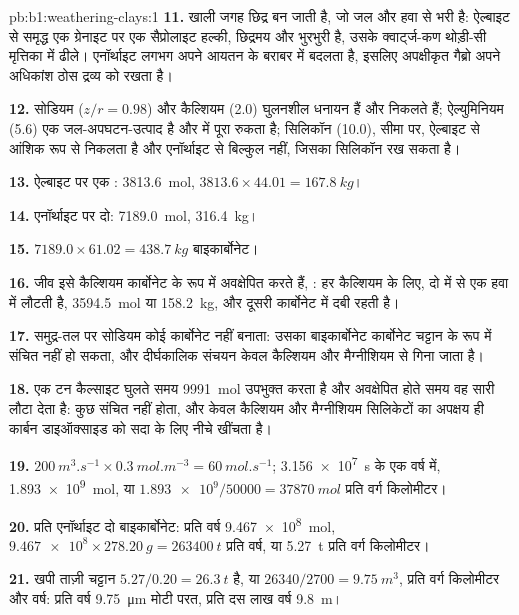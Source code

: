 \begin{solution}{pb:b1:weathering-clays:1}
\textbf{11.} खाली जगह छिद्र बन जाती है, जो जल और हवा से भरी है: ऐल्बाइट से समृद्ध एक ग्रेनाइट पर एक सैप्रोलाइट हल्की, छिद्रमय और भुरभुरी है, उसके क्वार्ट्ज-कण थोड़ी-सी मृत्तिका में ढीले। एनॉर्थाइट लगभग अपने आयतन के बराबर  में बदलता है, इसलिए अपक्षीकृत गैब्रो अपने अधिकांश ठोस द्रव्य को रखता है।

\textbf{12.} सोडियम ($z/r = 0.98$) और कैल्शियम (2.0) घुलनशील धनायन हैं और निकलते हैं; ऐल्युमिनियम (5.6) एक जल-अपघटन-उत्पाद है और  में पूरा रुकता है; सिलिकॉन (10.0), सीमा पर, ऐल्बाइट से आंशिक रूप से निकलता है और एनॉर्थाइट से बिल्कुल नहीं, जिसका सिलिकॉन  रख सकता है।

\textbf{13.} ऐल्बाइट पर एक : \qty{3813.6}{mol}, $3813.6 \times 44.01 =
\qty{167.8}{kg}$।

\textbf{14.} एनॉर्थाइट पर दो: \qty{7189.0}{mol}, \qty{316.4}{kg}।

\textbf{15.} $7189.0 \times 61.02 = \qty{438.7}{kg}$ बाइकार्बोनेट।

\textbf{16.} जीव इसे कैल्शियम कार्बोनेट के रूप में अवक्षेपित करते हैं,
: हर कैल्शियम के लिए, दो में से एक
 हवा में लौटती है, \qty{3594.5}{mol} या \qty{158.2}{kg}, और
दूसरी कार्बोनेट में दबी रहती है।

\textbf{17.} समुद्र-तल पर सोडियम कोई कार्बोनेट नहीं बनाता: उसका बाइकार्बोनेट कार्बोनेट चट्टान के रूप में संचित नहीं हो सकता, और दीर्घकालिक संचयन केवल कैल्शियम और मैग्नीशियम से गिना जाता है।

\textbf{18.} एक टन कैल्साइट घुलते समय \qty{9991}{mol}  उपभुक्त करता है और अवक्षेपित होते समय वह सारी लौटा देता है: कुछ संचित नहीं होता, और केवल कैल्शियम और मैग्नीशियम सिलिकेटों का अपक्षय ही कार्बन डाइऑक्साइड को सदा के लिए नीचे खींचता है।

\textbf{19.} $\qty{200}{m^3.s^{-1}} \times \qty{0.3}{mol.m^{-3}} =
\qty{60}{mol.s^{-1}}$; \qty{3.156e7}{s} के एक वर्ष में, \qty{1.893e9}{mol}, या
$\num{1.893e9}/\num{50000} = \qty{37870}{mol}$ प्रति वर्ग किलोमीटर।

\textbf{20.} प्रति एनॉर्थाइट दो बाइकार्बोनेट: प्रति वर्ष \qty{9.467e8}{mol},
$\num{9.467e8}\times\qty{278.20}{g} = \qty{263400}{t}$ प्रति वर्ष, या
\qty{5.27}{t} प्रति वर्ग किलोमीटर।

\textbf{21.} खपी ताज़ी चट्टान $5.27/0.20 = \qty{26.3}{t}$ है, या
$\num{26340}/2700 = \qty{9.75}{m^3}$, प्रति वर्ग किलोमीटर और वर्ष: प्रति वर्ष
\qty{9.75}{\micro m} मोटी परत, प्रति दस लाख वर्ष \qty{9.8}{m}।


\end{solution}
